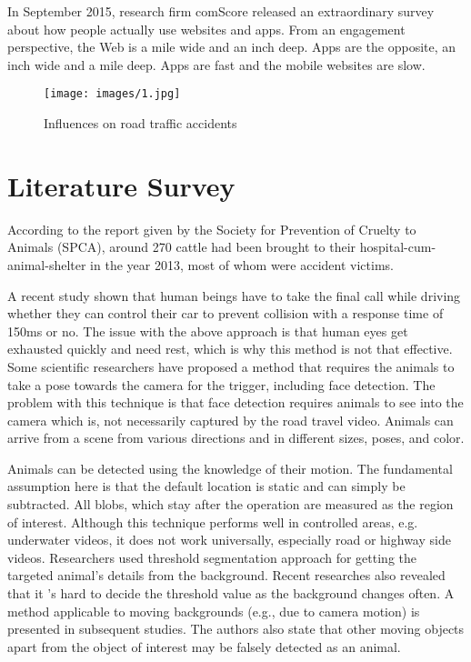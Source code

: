 \documentclass[14pt,a4paper,final]{extreport}
\begin{document}
\newpage

\item In September 2015, research firm comScore released an extraordinary survey about how people actually use websites and apps. From an engagement perspective, the Web is a mile wide and an inch deep. Apps are the opposite, an inch wide and a mile deep. Apps are fast and the mobile websites are slow.
\newline
\newline
\begin{figure}[h]
	\begin{center}
		\texttt{[image: images/1.jpg]}
		\vspace{.1 cm}
    \caption[Influences on road traffic accidents]{Influences on road traffic accidents}
	\end{center}
\end{figure}


\begin{enumerate}
\end{enumerate}



\chapter{Literature Survey}
\item   According to the report given by the Society for Prevention of Cruelty to Animals (SPCA), around 270 cattle had been brought to their hospital-cum-animal-shelter in the year 2013, most of whom were accident victims. 

\item A recent study  shown that human beings have to take the final call while driving whether they can control their car to prevent collision with a response time of 150ms or no. The issue with the above approach is that human eyes get exhausted quickly and need rest, which is why this method is not that effective. Some scientific researchers have proposed a method that requires the animals to take a pose towards the camera for the trigger, including face detection. The problem with this technique is that face detection requires animals to see into the camera which is, not necessarily captured by the road travel video. Animals can arrive from a scene from various directions and in different sizes, poses, and color.

\item Animals can be detected using the knowledge of their motion. The fundamental assumption here is that the default location is static and can simply be subtracted. All blobs, which stay after the operation are measured as the region of interest. Although this technique performs well in controlled areas, e.g. underwater videos, it does not work universally, especially road or highway side videos. Researchers used threshold segmentation approach for getting the targeted animal’s details from the background. Recent researches also revealed that it ’s hard to decide the threshold value as the background changes often. A method applicable to moving backgrounds (e.g., due to camera motion) is presented in subsequent studies. The authors also state that other moving objects apart from the object of interest may be falsely detected as an animal.
\end{document}
